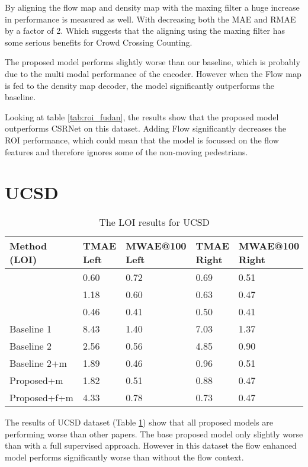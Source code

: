 By aligning the flow map and density map with the maxing filter a huge increase in performance is measured as well. With decreasing both the MAE and RMAE by a factor of 2. Which suggests that the aligning using the maxing filter has some serious benefits for Crowd Crossing Counting.

The proposed model performs slightly worse than our baseline, which is probably due to the multi modal performance of the encoder. However when the Flow map is fed to the density map decoder, the model significantly outperforms the baseline.

Looking at table \ref{tab:roi_fudan}, the results show that the proposed model outperforms CSRNet \cite{li2018csrnet} on this dataset. Adding Flow significantly decreases the ROI performance, which could mean that the model is focussed on the flow features and therefore ignores some of the non-moving pedestrians.

\section{UCSD}

\begin{table}
      \centering
		\begin{tabular}{lllll}
		\hline
		Method (LOI)                               & TMAE Left & MWAE@100 Left & TMAE Right & MWAE@100 Right \\ \hline
		\multicolumn{1}{l|}{\cite{ma_counting_2016}} & 0.60 & 0.72 & 0.69 & 0.51 \\
		\multicolumn{1}{l|}{\cite{leibe_crossing-line_2016}}& 1.18 & 0.60 & 0.63 & 0.47 \\
		\multicolumn{1}{l|}{\cite{zheng_cross-line_2019}} & 0.46 & 0.41 & 0.50 & 0.41 \\
		\multicolumn{1}{l|}{Baseline 1}          & 8.43 & 1.40 & 7.03 & 1.37 \\
		\multicolumn{1}{l|}{Baseline 2}          & 2.56 & 0.56 & 4.85 & 0.90 \\
		\multicolumn{1}{l|}{Baseline 2+m}      & 1.89 & 0.46 &  0.96 & 0.51 \\
		\multicolumn{1}{l|}{Proposed+m}        	 & 1.82 & 0.51 & 0.88 & 0.47 \\
		\multicolumn{1}{l|}{Proposed+f+m} & 4.33 & 0.78 & 0.73 & 0.47 \\ \hline
		\end{tabular}
		\caption{\label{tab:loi_ucsd}The LOI results for UCSD}
\end{table}
The results of UCSD dataset (Table \ref{tab:loi_ucsd}) show that all proposed models are performing worse than other papers. The base proposed model only slightly worse than \cite{leibe_crossing-line_2016} with a full supervised approach. However in this dataset the flow enhanced model performs significantly worse than without the flow context.





